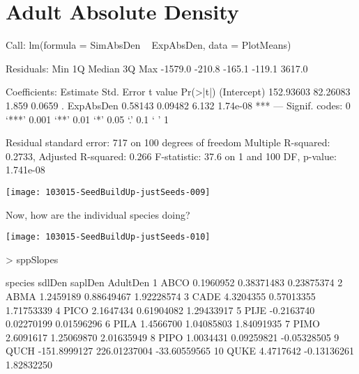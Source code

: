 \documentclass{article}
\begin{document}
\section{Adult Absolute Density}
\begin{Schunk}
\begin{Soutput}
Call:
lm(formula = SimAbsDen ~ ExpAbsDen, data = PlotMeans)

Residuals:
    Min      1Q  Median      3Q     Max 
-1579.0  -210.8  -165.1  -119.1  3617.0 

Coefficients:
             Estimate Std. Error t value Pr(>|t|)    
(Intercept) 152.93603   82.26083   1.859   0.0659 .  
ExpAbsDen     0.58143    0.09482   6.132 1.74e-08 ***
---
Signif. codes:  0 ‘***’ 0.001 ‘**’ 0.01 ‘*’ 0.05 ‘.’ 0.1 ‘ ’ 1

Residual standard error: 717 on 100 degrees of freedom
Multiple R-squared:  0.2733,	Adjusted R-squared:  0.266 
F-statistic:  37.6 on 1 and 100 DF,  p-value: 1.741e-08
\end{Soutput}
\end{Schunk}
\texttt{[image: 103015-SeedBuildUp-justSeeds-009]}

Now, how are the individual species doing?

\texttt{[image: 103015-SeedBuildUp-justSeeds-010]}
\begin{Schunk}
\begin{Sinput}
>   sppSlopes
\end{Sinput}
\begin{Soutput}
   species       sdlDen      saplDen     AdultDen
1     ABCO    0.1960952   0.38371483   0.23875374
2     ABMA    1.2459189   0.88649467   1.92228574
3     CADE    4.3204355   0.57013355   1.71753339
4     PICO    2.1647434   0.61904082   1.29433917
5     PIJE   -0.2163740   0.02270199   0.01596296
6     PILA    1.4566700   1.04085803   1.84091935
7     PIMO    2.6091617   1.25069870   2.01635949
8     PIPO    1.0034431   0.09259821  -0.05328505
9     QUCH -151.8999127 226.01237004 -33.60559565
10    QUKE    4.4717642  -0.13136261   1.82832250
\end{Soutput}
\end{Schunk}




\newpage
\end{document}
